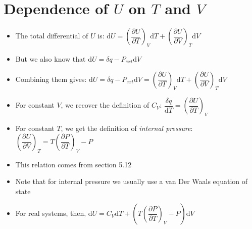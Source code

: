 \documentclass[12pt, openany, letterpaper]{memoir}
\begin{document}
\section*{Dependence of $U$ on $T$ and $V$}
\begin{itemize}
	\item The total differential of $U$ is: $\mathrm{d}U = \left(\dfrac{\partial U}{\partial T}\right)_V\mathrm{d}T + \left(\dfrac{\partial U}{\partial V}\right)_T \mathrm{d} V$
	\item But we also know that $\mathrm{d}U = \delta q - P_{ext}\mathrm{d}V$
	\item Combining them gives: $\mathrm{d}U = \delta q - P_{ext}\mathrm{d}V = \left(\dfrac{\partial U}{\partial T}\right)_V\mathrm{d}T + \left(\dfrac{\partial U}{\partial V}\right)_T \mathrm{d} V$
	\item For constant $V$, we recover the definition of $C_V$: $\dfrac{\delta q}{\mathrm{d}T} = \left(\dfrac{\partial U}{\partial T}\right)_V$
	\item For constant $T$, we get the definition of \emph{internal pressure}: $\left(\dfrac{\partial U}{\partial V}\right)_T =T\left(\dfrac{\partial P}{\partial T}\right)_V - P$
	\item This relation comes from section 5.12
	\item Note that for internal pressure we usually use a van Der Waals equation of state
	\item For real systems, then, $\mathrm{d}U = C_V\mathrm{d}T + \left(T\left(\dfrac{\partial P}{\partial T}\right)_V - P\right) \mathrm{d}V$
\end{itemize}
\end{document}
